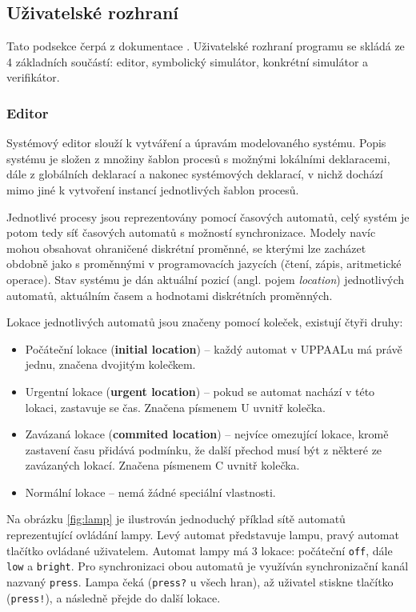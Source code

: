\subsection{Uživatelské rozhraní} \label{uppaal_gui}
Tato podsekce čerpá z dokumentace \cite{uppaal_doc}. Uživatelské rozhraní programu se skládá ze 4 základních součástí: editor, symbolický simulátor, konkrétní simulátor a verifikátor.

\subsubsection{Editor}
Systémový editor slouží k vytváření a úpravám modelovaného systému. Popis systému je složen z množiny šablon procesů s možnými lokálními deklaracemi, dále z globálních deklarací a nakonec systémových deklarací, v nichž dochází mimo jiné k vytvoření instancí jednotlivých šablon procesů.

Jednotlivé procesy jsou reprezentovány pomocí časových automatů, celý systém je potom tedy síť časových automatů s možností synchronizace. Modely navíc mohou obsahovat ohraničené diskrétní proměnné, se kterými lze zacházet obdobně jako s proměnnými v programovacích jazycích (čtení, zápis, aritmetické operace). Stav systému je dán aktuální pozicí (angl. pojem \textit{location}) jednotlivých automatů, aktuálním časem a hodnotami diskrétních proměnných.

Lokace jednotlivých automatů jsou značeny pomocí koleček, existují čtyři druhy:
\begin{itemize}
    \item Počáteční lokace (\textbf{initial location}) -- každý automat v UPPAALu má právě jednu, značena dvojitým kolečkem.
    \item Urgentní lokace (\textbf{urgent location}) -- pokud se automat nachází v této lokaci, zastavuje se čas. Značena písmenem U uvnitř kolečka.
    \item Zavázaná lokace (\textbf{commited location}) -- nejvíce omezující lokace, kromě zastavení času přidává podmínku, že další přechod musí být z některé ze zavázaných lokací. Značena písmenem C uvnitř kolečka.
    \item Normální lokace -- nemá žádné speciální vlastnosti.
\end{itemize}

Na obrázku \ref{fig:lamp} je ilustrován jednoduchý příklad sítě automatů reprezentující ovládání lampy. Levý automat představuje lampu, pravý automat tlačítko ovládané uživatelem. Automat lampy má 3 lokace: počáteční \texttt{off}, dále \texttt{low} a \texttt{bright}. Pro synchronizaci obou automatů je využíván synchronizační kanál nazvaný \texttt{press}. Lampa čeká (\texttt{press?} u všech hran), až uživatel stiskne tlačítko (\texttt{press!}), a následně přejde do další lokace.

